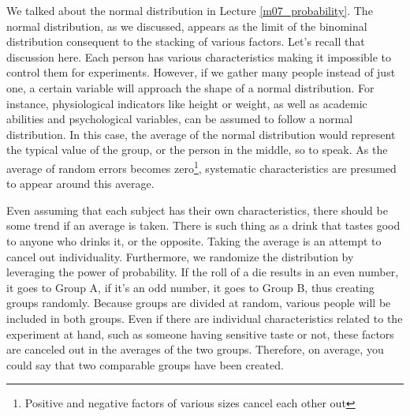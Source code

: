 \documentclass{ltjbook}
\begin{document}
We talked about the normal distribution in Lecture \ref{m07_probability}. The normal distribution, as we discussed, appears as the limit of the binominal distribution consequent to the stacking of various factors. Let's recall that discussion here. Each person has various characteristics making it impossible to control them for experiments. However, if we gather many people instead of just one, a certain variable will approach the shape of a normal distribution. For instance, physiological indicators like height or weight, as well as academic abilities and psychological variables, can be assumed to follow a normal distribution. In this case, the average of the normal distribution would represent the typical value of the group, or the person in the middle, so to speak. As the average of random errors becomes zero\footnote{Positive and negative factors of various sizes cancel each other out}, systematic characteristics are presumed to appear around this average.


Even assuming that each subject has their own characteristics, there should be some trend if an average is taken. There is such thing as a drink that tastes good to anyone who drinks it, or the opposite. Taking the average is an attempt to cancel out individuality.
Furthermore, we randomize the distribution by leveraging the power of probability. If the roll of a die results in an even number, it goes to Group A, if it's an odd number, it goes to Group B, thus creating groups randomly. Because groups are divided at random, various people will be included in both groups. Even if there are individual characteristics related to the experiment at hand, such as someone having sensitive taste or not, these factors are canceled out in the averages of the two groups. Therefore, on average, you could say that two comparable groups have been created.
\end{document}
